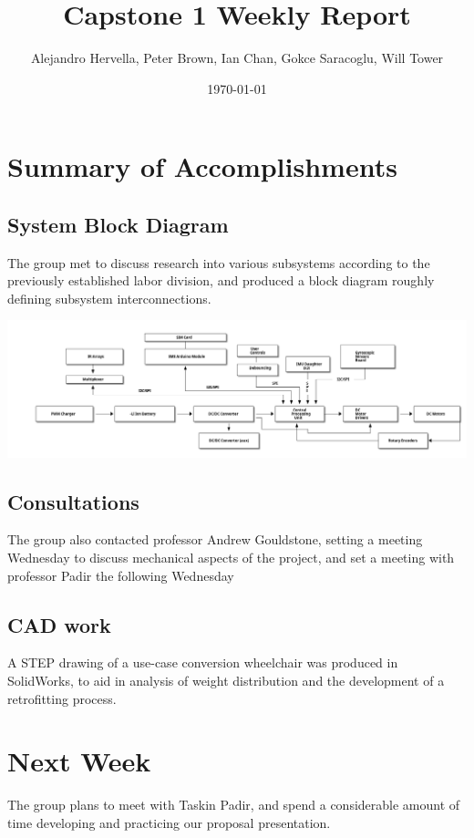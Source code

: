 \documentclass[11pt]{article}
\author{Alejandro Hervella, Peter Brown, Ian Chan, Gokce Saracoglu, Will Tower}
\date{\today}
\title{Capstone 1 Weekly Report}
\begin{document}
\maketitle
\tableofcontents



\section{Summary of Accomplishments}
\label{sec:org9ec5fd5}

\subsection{System Block Diagram}
\label{sec:orga1fc6db}
The group met to discuss research into various subsystems according to the previously established labor division, and produced a block diagram roughly defining subsystem interconnections.

\begin{center}
\includegraphics[width=1.2\linewidth]{block_diagram.png}
\end{center}


\subsection{Consultations}
\label{sec:org9ad63e6}
The group also contacted professor Andrew Gouldstone, setting a meeting Wednesday to discuss mechanical aspects of the project, and set a meeting with professor Padir the following Wednesday

\subsection{CAD work}
\label{sec:org6692719}
A STEP drawing of a use-case conversion wheelchair was produced in SolidWorks, to aid in analysis of weight distribution and the development of a retrofitting process.

\section{Next Week}
\label{sec:org9e78a51}

The group plans to meet with Taskin Padir, and spend a considerable amount of time developing and practicing our proposal presentation.
\end{document}
